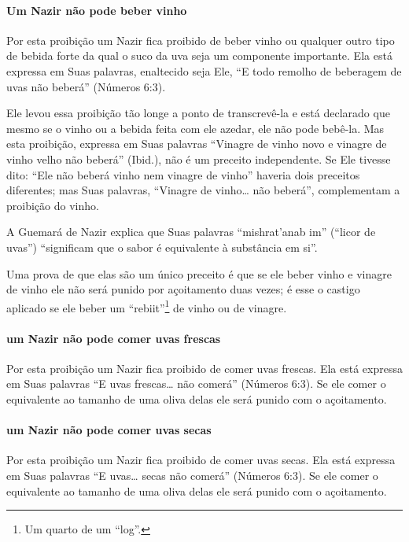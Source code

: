 \paragraph{Um Nazir não pode beber vinho}

Por esta proibição um Nazir fica proibido de beber vinho ou qualquer
outro tipo de bebida forte da qual o suco da uva seja um componente
importante. Ela está expressa em Suas palavras, enaltecido seja Ele, ``E
todo remolho de beberagem de uvas não beberá'' (Números 6:3).

Ele levou essa proibição tão longe a ponto de transcrevê-la e está
declarado que mesmo se o vinho ou a bebida feita com ele azedar, ele não
pode bebê-la. Mas esta proibição, expressa em Suas palavras ``Vinagre
de vinho novo e vinagre de vinho velho não beberá'' (Ibid.), não é um
preceito independente. Se Ele tivesse dito: ``Ele não beberá vinho nem
vinagre de vinho'' haveria dois preceitos diferentes; mas Suas
palavras, ``Vinagre de vinho\ldots{} não beberá'', complementam a proibição
do vinho.

A Guemará de Nazir explica que Suas palavras ``mishrat'anab im''
(``licor de uvas'') ``significam que o sabor é equivalente à substância
em si''.

Uma prova de que elas são um único preceito é que se ele beber vinho e
vinagre de vinho ele não será punido por açoitamento duas vezes; é esse
o castigo aplicado se ele beber um ``rebiit''\footnote{Um quarto de um ``log''.} de
vinho ou de vinagre.

\paragraph{um Nazir não pode comer uvas frescas}

Por esta proibição um Nazir fica proibido de comer uvas frescas. Ela
está expressa em Suas palavras ``E uvas frescas\ldots{} não comerá''
(Números 6:3). Se ele comer o equivalente ao tamanho de uma oliva delas
ele será punido com o açoitamento.

\paragraph{um Nazir não pode comer uvas secas}

Por esta proibição um Nazir fica proibido de comer uvas secas. Ela está
expressa em Suas palavras ``E uvas\ldots{} secas não comerá'' (Números 6:3).
Se ele comer o equivalente ao tamanho de uma oliva delas ele será punido
com o açoitamento.

